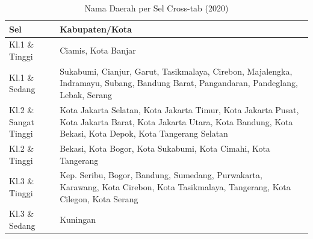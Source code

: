 \begin{table}[H]
\centering
\small
\caption{Nama Daerah per Sel Cross-tab (2020)} \label{tab:crossname2020}
\begin{tabular}{|>{\raggedright\arraybackslash}m{}|>{\raggedright\arraybackslash}m{}|}
\hline
\textbf{Sel} & \textbf{Kabupaten/Kota} \\
\hline
Kl.1 \& Tinggi & Ciamis, Kota Banjar \\
\hline
Kl.1 \& Sedang & Sukabumi, Cianjur, Garut, Tasikmalaya, Cirebon, Majalengka, Indramayu, Subang, Bandung Barat, Pangandaran, Pandeglang, Lebak, Serang \\
\hline
Kl.2 \& Sangat Tinggi & Kota Jakarta Selatan, Kota Jakarta Timur, Kota Jakarta Pusat, Kota Jakarta Barat, Kota Jakarta Utara, Kota Bandung, Kota Bekasi, Kota Depok, Kota Tangerang Selatan \\
\hline
Kl.2 \& Tinggi & Bekasi, Kota Bogor, Kota Sukabumi, Kota Cimahi, Kota Tangerang \\
\hline
Kl.3 \& Tinggi & Kep. Seribu, Bogor, Bandung, Sumedang, Purwakarta, Karawang, Kota Cirebon, Kota Tasikmalaya, Tangerang, Kota Cilegon, Kota Serang \\
\hline
Kl.3 \& Sedang & Kuningan \\
\hline
\end{tabular}
\end{table}